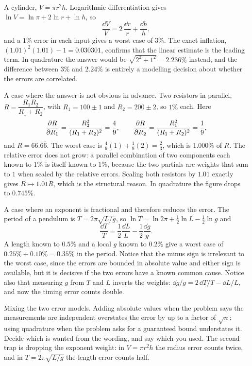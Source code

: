 \begin{worked}
A cylinder, $V=\pi r^{2}h$. Logarithmic differentiation gives $\ln V=\ln\pi+2\ln r+\ln h$, so
\[
\frac{\dd V}{V}=2\,\frac{\dd r}{r}+\frac{\dd h}{h},
\]
and a $1\%$ error in each input gives a worst case of $3\%$. The exact inflation, $(1.01)^{2}(1.01)-1=0.030301$, confirms that the linear estimate is the leading term. In quadrature the answer would be $\sqrt{2^{2}+1^{2}}=2.236\%$ instead, and the difference between $3\%$ and $2.24\%$ is entirely a modelling decision about whether the errors are correlated.

A case where the answer is not obvious in advance. Two resistors in parallel, $R=\dfrac{R_{1}R_{2}}{R_{1}+R_{2}}$, with $R_{1}=100\pm1$ and $R_{2}=200\pm2$, so $1\%$ each. Here
\[
\frac{\partial R}{\partial R_{1}}=\frac{R_{2}^{2}}{(R_{1}+R_{2})^{2}}=\frac49,\qquad
\frac{\partial R}{\partial R_{2}}=\frac{R_{1}^{2}}{(R_{1}+R_{2})^{2}}=\frac19 ,
\]
and $R=66.6\overline{6}$. The worst case is $\tfrac49(1)+\tfrac19(2)=\tfrac23$, which is $1.000\%$ of $R$. The relative error does not grow: a parallel combination of two components each known to $1\%$ is itself known to $1\%$, because the two partials are weights that sum to $1$ when scaled by the relative errors. Scaling both resistors by $1.01$ exactly gives $R\mapsto1.01R$, which is the structural reason. In quadrature the figure drops to $0.745\%$.

A case where an exponent is fractional and therefore reduces the error. The period of a pendulum is $T=2\pi\sqrt{L/g}$, so $\ln T=\ln 2\pi+\tfrac12\ln L-\tfrac12\ln g$ and
\[
\frac{\dd T}{T}=\frac12\frac{\dd L}{L}-\frac12\frac{\dd g}{g}.
\]
A length known to $0.5\%$ and a local $g$ known to $0.2\%$ give a worst case of $0.25\%+0.10\%=0.35\%$ in the period. Notice that the minus sign is irrelevant to the worst case, since the errors are bounded in absolute value and either sign is available, but it is decisive if the two errors have a known common cause. Notice also that measuring $g$ from $T$ and $L$ inverts the weights: $\dd g/g=2\,\dd T/T-\dd L/L$, and now the timing error counts double.
\end{worked}

\begin{trap}
Mixing the two error models. Adding absolute values when the problem says the measurements are independent overstates the error by up to a factor of $\sqrt{n}$; using quadrature when the problem asks for a guaranteed bound understates it. Decide which is wanted from the wording, and say which you used. The second trap is dropping the exponent weight: in $V=\pi r^{2}h$ the radius error counts twice, and in $T=2\pi\sqrt{L/g}$ the length error counts half.
\end{trap}

